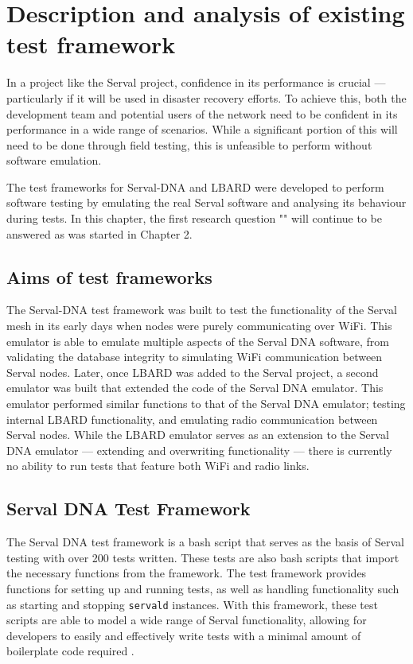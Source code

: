 \chapter{Description and analysis of existing test framework} 
\label{Chapter3} 

In a project like the Serval project, confidence in its performance is crucial — particularly if it will be used in disaster recovery efforts.
To achieve this, both the development team and potential users of the network need to be confident in its performance in a wide range of scenarios. 
While a significant portion of this will need to be done through field testing, this is unfeasible to perform without software emulation.

The test frameworks for Serval-DNA and LBARD were developed to perform software testing by emulating the real Serval software and analysing its behaviour during tests.
In this chapter, the first research question "\firstRQ" will continue to be answered as was started in Chapter 2. 


\section{Aims of test frameworks}
The Serval-DNA test framework was built to test the functionality of the Serval mesh in its early days when nodes were purely communicating over WiFi. 
This emulator is able to emulate multiple aspects of the Serval DNA software, from validating the database integrity to simulating WiFi communication between Serval nodes. 
Later, once LBARD was added to the Serval project, a second emulator was built that extended the code of the Serval DNA emulator.
This emulator performed similar functions to that of the Serval DNA emulator; testing internal LBARD functionality, and emulating radio communication between Serval nodes. 
While the LBARD emulator serves as an extension to the Serval DNA emulator — extending and overwriting functionality — there is currently no ability to run tests that feature both WiFi and radio links. 


\section{Serval DNA Test Framework}
The Serval DNA test framework is a bash script that serves as the basis of Serval testing with over 200 tests written.
These tests are also bash scripts that import the necessary functions from the framework. 
The test framework provides functions for setting up and running tests, as well as handling functionality such as starting and stopping \texttt{servald} instances.
With this framework, these test scripts are able to model a wide range of Serval functionality, allowing for developers to easily and effectively write tests with a minimal amount of boilerplate code required \parencite{servalTestDocumentation}.

